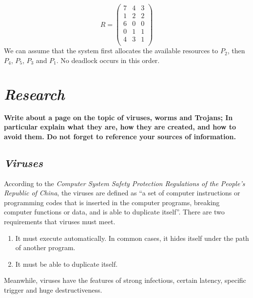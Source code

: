 \documentclass{article}
\begin{document}
\begin{spacing}{1.5}
\begin{enumerate}
	\begin{equation}
	R=\left(           
  	\begin{array}{ccc}
    7 & 4 & 3\\
    1 & 2 & 2\\
    6 & 0 & 0\\
    0 & 1 & 1\\
    4 & 3 & 1\\
  	\end{array}
	\right)
	\end{equation}
	We can assume that the system first allocates the available resources to $P_{2}$, then $P_{4}$, $P_{5}$, $P_{3}$ and $P_{1}$. No deadlock occurs in this order.
\end{enumerate}
\newpage
\section{\textit{Research\cite{ex3}}}
\textbf{Write about a page on the topic of viruses, worms and Trojans; In particular explain what they are, how they are created, and how to avoid them. Do not forget to reference your sources of information.}
\subsection{\textit{Viruses}}
According to the \textit{Computer System Safety Protection Regulations of the People's Republic of China}, the viruses are defined as ``a set of computer instructions or programming codes that is inserted in the computer programs, breaking computer functions or data, and is able to duplicate itself''. There are two requirements that viruses must meet.
\begin{enumerate}
	\item It must execute automatically. In common cases, it hides itself under the path of another program.
	\item It must be able to duplicate itself. 
\end{enumerate}
Meanwhile, viruses have the features of strong infectious, certain latency, specific trigger and huge destructiveness.

\end{spacing}
\end{document}
